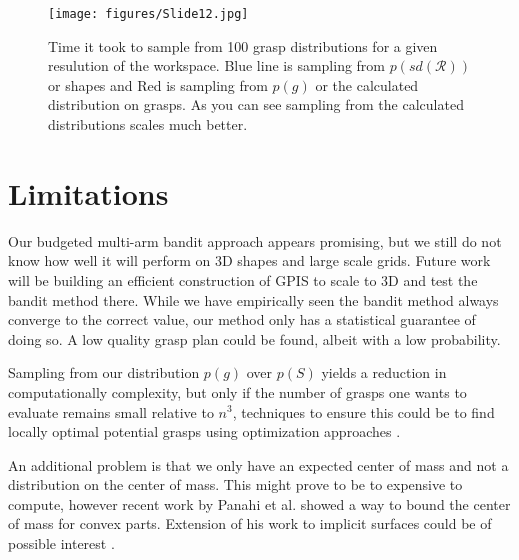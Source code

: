 \documentclass[letterpaper, 10 pt, conference]{ieeeconf}  %
\begin{document}
\begin{figure}[ht!]
\centering
\texttt{[image: figures/Slide12.jpg]}
\caption{ \footnotesize Time it took to sample from 100 grasp distributions for a given resulution of the workspace. Blue line is sampling from $p(sd(\mathcal{R}))$ or shapes and Red is sampling from $p(g)$ or the calculated distribution on grasps. As you can see sampling from the calculated distributions scales much better. }
\vspace*{-10pt}
\label{fig:speed_dif}
\end{figure}

\section{Limitations} 

Our budgeted multi-arm bandit approach appears promising, but we still do not know how well it will perform on 3D shapes and large scale grids. Future work will be building an efficient construction of GPIS to scale to 3D and test the bandit method there. While we have empirically seen the bandit method always converge to the correct value, our method only has a statistical guarantee of doing so. A low quality grasp plan could be found, albeit with a low probability. 

Sampling from our distribution $p(g)$ over $p(S)$ yields a reduction in computationally complexity, but only if the number of grasps one wants to evaluate remains small relative to $n^3$, techniques to ensure this could be to find locally optimal potential grasps using optimization approaches \cite{jeffs}. 

An additional problem is that we only have an expected center of mass and not a distribution on the center of mass. This might prove to be to expensive to compute, however recent work by Panahi et al. showed a way to bound the center of mass for convex parts. Extension of his work to implicit surfaces could be of possible interest \cite{panahi2014bounding}.  
\end{document}
